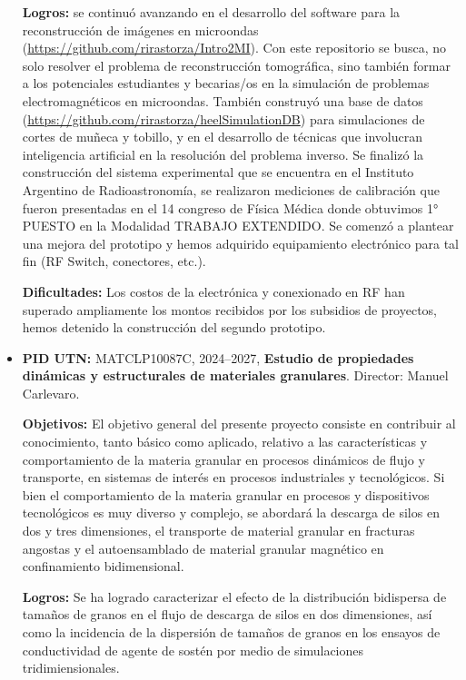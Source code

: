 \documentclass[a4paper,11pt,twoside,final,titlepage,onecolumn,openright]{report}
\begin{document}
\begin{itemize}
    \textbf{Logros:} se continuó avanzando en el desarrollo del software para la reconstrucción de imágenes en microondas (\href{https://github.com/rirastorza/Intro2MI}{https://github.com/rirastorza/Intro2MI}). Con este repositorio se busca, no solo resolver el problema de reconstrucción tomográfica, sino también formar a los potenciales estudiantes y becarias/os en la simulación de problemas electromagnéticos en microondas. También construyó una base de datos (\href{https://github.com/rirastorza/heelSimulationDB}{https://github.com/rirastorza/heelSimulationDB}) para simulaciones de cortes de muñeca y tobillo, y en el desarrollo de técnicas que involucran inteligencia artificial en la resolución del problema inverso. Se finalizó la construcción del sistema experimental que se encuentra en el Instituto Argentino de Radioastronomía, se realizaron mediciones de calibración que fueron presentadas en el 14 congreso de Física Médica donde obtuvimos 1° PUESTO en la Modalidad TRABAJO EXTENDIDO. Se comenzó a plantear una mejora del prototipo y hemos adquirido equipamiento electrónico para tal fin (RF Switch, conectores, etc.).

    \textbf{Dificultades:} Los costos de la electrónica y conexionado en RF han superado ampliamente los montos recibidos por los subsidios de proyectos, hemos detenido la construcción del segundo prototipo.

  \item \textbf{PID UTN:} MATCLP10087C, 2024--2027, \textbf{Estudio de propiedades dinámicas y estructurales de materiales granulares}. Director: Manuel Carlevaro.

    \textbf{Objetivos:} El objetivo general del presente proyecto consiste en contribuir al conocimiento, tanto básico como aplicado, relativo a las características y comportamiento de la materia granular en procesos dinámicos de flujo y transporte, en sistemas de interés en procesos industriales y tecnológicos. Si bien el comportamiento de la materia granular en procesos y dispositivos tecnológicos es muy diverso y complejo, se abordará la descarga de silos en dos y tres dimensiones, el transporte de material granular en fracturas angostas y el autoensamblado de material granular magnético en confinamiento bidimensional.

    \textbf{Logros:} Se ha logrado caracterizar el efecto de la distribución bidispersa de tamaños de granos en el flujo de descarga de silos en dos dimensiones, así como la incidencia de la dispersión de tamaños de granos en los ensayos de conductividad de agente de sostén por medio de simulaciones tridimiensionales.


\end{itemize}
\end{document}

